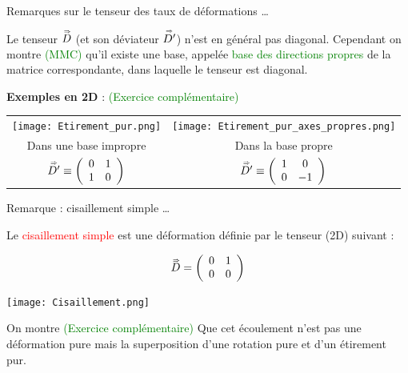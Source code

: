 \begin{frame}{Remarques sur le tenseur des taux de déformations  \ldots}
\small

Le tenseur $\accentset{\Rightarrow}{D}$ (et son déviateur $\accentset{\Rightarrow}{D'}$) n'est en général pas diagonal.
Cependant on montre \textcolor{green}{(MMC)} qu'il existe une base, appelée \textcolor{green}{base des directions propres} de la matrice correspondante, dans laquelle le tenseur est diagonal.

\medskip
\pause
{\bf Exemples en 2D } :   \textcolor{green}{(Exercice complémentaire)}
 
\begin{center}
\begin{tabular}{cc}
	\texttt{[image: Etirement\_pur.png]}
	&
	\texttt{[image: Etirement\_pur\_axes\_propres.png]}\\
	Dans une base impropre
	& Dans la base propre 
	\\
	$\accentset{\Rightarrow}{D'} \equiv  \left(
\begin{array}{cc}
		0 & 1 
		\\
		1 & 0 
	\end{array}
	\right)
	$ & 
	$\accentset{\Rightarrow}{D'} \equiv  \left(
\begin{array}{cc}
		1 & 0 
		\\
		0 & -1 
	\end{array}
	\right)
	$
\end{tabular}
\end{center}


\end{frame}



\begin{frame}{Remarque : cisaillement simple  \ldots}
\small

Le \textcolor{red}{cisaillement simple } est une déformation définie par le tenseur (2D) suivant :

\[
\accentset{\Rightarrow}{D}  = 
	\left(
	\begin{array}{cc}
		0 & 1 
		\\
		0 & 0
	\end{array}
	\right)
\]

\bigskip

\begin{center}
	\texttt{[image: Cisaillement.png]}
\end{center}

\pause

\bigskip 
On montre \textcolor{green}{(Exercice complémentaire)} Que cet écoulement n'est pas une déformation pure mais la superposition d'une rotation pure et d'un étirement pur.

\end{frame}



